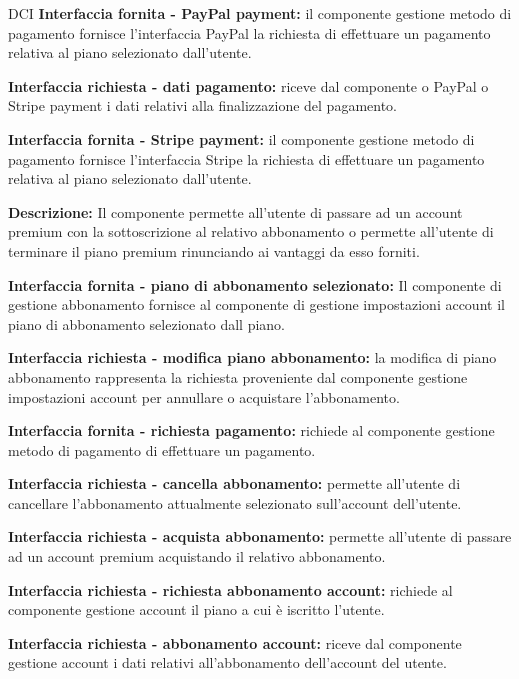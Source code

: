\begin{listaPersonale}{DCI}
    \textbf{Interfaccia fornita - PayPal payment:} il componente gestione metodo di pagamento fornisce l'interfaccia PayPal la richiesta di effettuare un pagamento relativa al piano selezionato dall'utente.

    \textbf{Interfaccia richiesta - dati pagamento:} riceve dal componente o PayPal o Stripe payment i dati relativi alla finalizzazione del pagamento.

    \textbf{Interfaccia fornita - Stripe payment:}  il componente gestione metodo di pagamento fornisce l'interfaccia Stripe la richiesta di effettuare un pagamento relativa al piano selezionato dall'utente.



    \textbf{Descrizione:} Il componente permette all'utente di passare ad un account premium con la sottoscrizione al relativo abbonamento o permette all'utente di terminare il piano premium rinunciando ai vantaggi da esso forniti.

    \textbf{Interfaccia fornita - piano di abbonamento selezionato:} Il componente di gestione abbonamento fornisce al componente di gestione impostazioni account il piano di abbonamento selezionato dall piano.

    \textbf{Interfaccia richiesta - modifica piano abbonamento:} la modifica di piano abbonamento rappresenta la richiesta proveniente dal componente gestione impostazioni account per annullare o acquistare l'abbonamento.

    \textbf{Interfaccia fornita - richiesta pagamento:} richiede al componente gestione metodo di pagamento di effettuare un pagamento.

    \textbf{Interfaccia richiesta - cancella abbonamento:} permette all'utente di cancellare l'abbonamento attualmente selezionato sull'account dell'utente.

    \textbf{Interfaccia richiesta - acquista abbonamento:} permette all'utente di passare ad un account premium acquistando il relativo abbonamento.

    \textbf{Interfaccia richiesta - richiesta abbonamento account:} richiede al componente gestione account il piano a cui è iscritto l'utente.

    \textbf{Interfaccia richiesta - abbonamento account:} riceve dal componente gestione account i dati relativi all'abbonamento dell'account del utente.




\end{listaPersonale}
